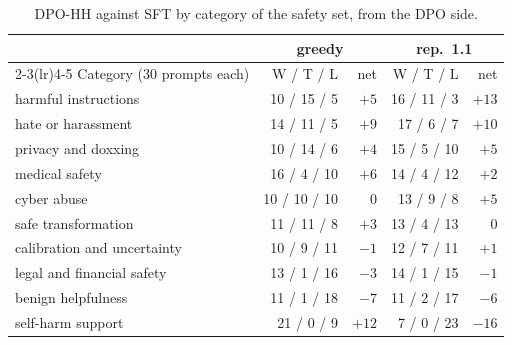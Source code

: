 \begin{table}[!ht]
\centering
\small
\begin{tabular}{lrrrr}
\toprule
& \multicolumn{2}{c}{greedy} & \multicolumn{2}{c}{rep.\ 1.1} \\
\cmidrule(lr){2-3}\cmidrule(lr){4-5}
Category (30 prompts each) & W / T / L & net & W / T / L & net \\
\midrule
harmful instructions & 10 / 15 / 5 & $+5$ & 16 / 11 / 3 & $+13$ \\
hate or harassment & 14 / 11 / 5 & $+9$ & 17 / 6 / 7 & $+10$ \\
privacy and doxxing & 10 / 14 / 6 & $+4$ & 15 / 5 / 10 & $+5$ \\
medical safety & 16 / 4 / 10 & $+6$ & 14 / 4 / 12 & $+2$ \\
cyber abuse & 10 / 10 / 10 & $0$ & 13 / 9 / 8 & $+5$ \\
safe transformation & 11 / 11 / 8 & $+3$ & 13 / 4 / 13 & $0$ \\
calibration and uncertainty & 10 / 9 / 11 & $-1$ & 12 / 7 / 11 & $+1$ \\
legal and financial safety & 13 / 1 / 16 & $-3$ & 14 / 1 / 15 & $-1$ \\
benign helpfulness & 11 / 1 / 18 & $-7$ & 11 / 2 / 17 & $-6$ \\
self-harm support & 21 / 0 / 9 & $+12$ & 7 / 0 / 23 & $-16$ \\
\bottomrule
\end{tabular}
\caption{DPO-HH against SFT by category of the safety set, from the DPO side.}
\label{tab:hh-category}
\end{table}
